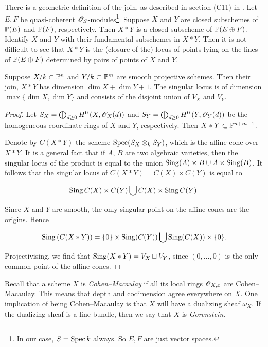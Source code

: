 There is a geometric definition of the join, as described in section (C11) in \cite{altman_joins}. Let $E,F$ be quasi-coherent $\OO_S$-modules\footnote{In our case, $S=\Spec k$  always. So $E,F$ are just vector spaces.}. Suppose $X$ and $Y$ are closed subschemes of $\P(E)$ and $\P(F)$, respectively. Then $X\ast Y$ is a closed subscheme of $\P(E \oplus F)$. Identify $X$ and $Y$ with their fundamental subschemes in $X \ast Y$. Then it is not difficult to see that $X \ast Y$ is the (closure of the) locus of points lying on the lines of $\P(E \oplus F)$ determined by pairs of points of $X$ and $Y$. 

\begin{proposition}
\label{lemma:join}
Suppose $X/k \subset \P^n$ and $Y/k \subset \P^m$ are smooth projective schemes. Then their join, $X \ast Y$ has dimension $\dim X+\dim Y+1$. The singular locus is of dimension $\max\{\dim X,\dim Y\}$ and consists of the disjoint union of $V_X$ and $V_Y$.
\end{proposition}
\begin{proof}
Let $S_X = \bigoplus_{d \geq 0} H^0\left(X,\OO_X(d)\right)$ and $S_Y = \bigoplus_{d \geq 0} H^0\left(Y,\OO_Y(d)\right)$ be the homogeneous coordinate rings of $X$ and $Y$, respectively. Then $X \ast Y \subset \P^{n+m+1}$. 

Denote by $C(X \ast Y)$ the scheme $\Spec (S_X \otimes_k S_Y)$, which is the affine cone over $X \ast Y$. It is a general fact that if $A$, $B$ are two algebraic varieties, then the singular locus of the product is equal to the union $\Sing (A) \times B \cup A \times \Sing(B)$. It follows that the singular locus of $C(X \ast Y) = C(X) \times C(Y)$ is equal to

\[
\Sing C(X) \times C(Y) \bigcup C(X) \times \Sing C(Y).
\]

Since $X$ and $Y$ are smooth, the only singular point on the affine cones are the origins. Hence

$$
\Sing\left(C(X \ast Y)\right) = \{0\} \times \Sing(C(Y)) \bigcup \Sing(C(X)) \times \{ 0\}.
$$

Projectivising, we find that $\Sing(X \ast Y) = V_X \sqcup V_Y$, since $(0,\ldots,0)$ is the only common point of the affine cones. 
\end{proof}

Recall that a scheme $X$ is \emph{Cohen--Macaulay} if all its local rings $\OO_{X,x}$ are Cohen--Macaulay. This means that depth and codimension agree everywhere on $X$. One implication of being Cohen--Macaulay is that $X$ will have a dualizing sheaf $\omega_X$. If the dualizing sheaf is a line bundle, then we say that $X$ is \emph{Gorenstein}.

